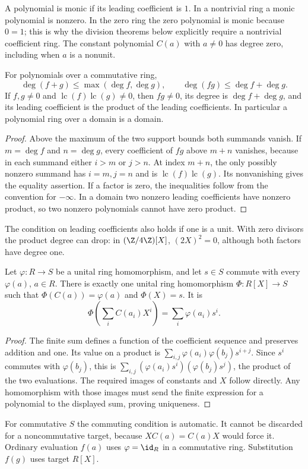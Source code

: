 A polynomial is monic if its leading coefficient is $1$. In a
nontrivial ring a monic polynomial is nonzero. In the zero ring the
zero polynomial is monic because $0=1$; this is why the division
theorems below explicitly require a nontrivial coefficient ring.
The constant polynomial $C(a)$ with $a\ne0$ has degree zero, including
when $a$ is a nonunit.

\begin{proposition}\label{prop:polynomial-degree}
For polynomials over a commutative ring,
\[
 \deg(f+g)\le\max(\deg f,\deg g),\qquad
 \deg(fg)\le\deg f+\deg g.
\]
If $f,g\ne0$ and $\operatorname{lc}(f)\operatorname{lc}(g)\ne0$,
then $fg\ne0$, its degree is $\deg f+\deg g$, and its leading
coefficient is the product of the leading coefficients.
In particular a polynomial ring over a domain is a domain.
\end{proposition}
\begin{proof}
Above the maximum of the two support bounds both summands vanish.
If $m=\deg f$ and $n=\deg g$, every coefficient of $fg$ above $m+n$
vanishes, because in each summand either $i>m$ or $j>n$. At index
$m+n$, the only possibly nonzero summand has $i=m,j=n$ and is
$\operatorname{lc}(f)\operatorname{lc}(g)$. Its nonvanishing gives
the equality assertion. If a factor is zero, the inequalities follow
from the convention for $-\infty$. In a domain two nonzero leading
coefficients have nonzero product, so two nonzero polynomials cannot
have zero product.
\end{proof}
The condition on leading coefficients also holds if one is a unit.
With zero divisors the product degree can drop: in $(\Z/4\Z)[X]$,
$(2X)^2=0$, although both factors have degree one.

\begin{theorem}\label{thm:polynomial-evaluation}
Let $\varphi:R\to S$ be a unital ring homomorphism, and let $s\in S$
commute with every $\varphi(a)$, $a\in R$. There is exactly one
unital ring homomorphism $\Phi:R[X]\to S$ such that
$\Phi(C(a))=\varphi(a)$ and $\Phi(X)=s$. It is
\[
 \Phi\left(\sum_i C(a_i)X^i\right)=\sum_i\varphi(a_i)s^i.
\]
\end{theorem}
\begin{proof}
The finite sum defines a function of the coefficient sequence and
preserves addition and one. Its value on a product is
$\sum_{i,j}\varphi(a_i)\varphi(b_j)s^{i+j}$.
Since $s^i$ commutes with $\varphi(b_j)$, this is
$\sum_{i,j}(\varphi(a_i)s^i)(\varphi(b_j)s^j)$, the product
of the two evaluations. The required images of constants and $X$
follow directly. Any homomorphism with those images must send the
finite expression for a polynomial to the displayed sum, proving
uniqueness.
\end{proof}
For commutative $S$ the commuting condition is automatic. It cannot be
discarded for a noncommutative target, because $XC(a)=C(a)X$ would
force it. Ordinary evaluation $f(a)$ uses $\varphi=\id_R$ in a
commutative ring. Substitution $f(g)$ uses target $R[X]$.

